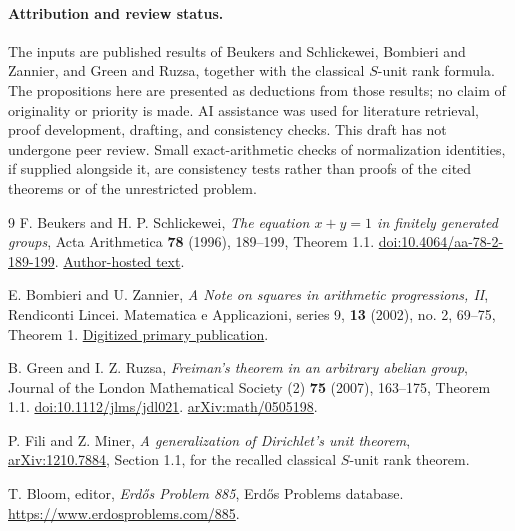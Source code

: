 \documentclass[11pt,letterpaper]{article}
\theoremstyle{remark}\newtheorem{remark}[theorem]{Remark}
\begin{document}
\paragraph{Attribution and review status.}
The inputs are published results of Beukers and Schlickewei, Bombieri and Zannier, and Green and Ruzsa, together with the classical $S$-unit rank formula. The propositions here are presented as deductions from those results; no claim of originality or priority is made. AI assistance was used for literature retrieval, proof development, drafting, and consistency checks. This draft has not undergone peer review. Small exact-arithmetic checks of normalization identities, if supplied alongside it, are consistency tests rather than proofs of the cited theorems or of the unrestricted problem.

\begin{thebibliography}{9}
 F. Beukers and H. P. Schlickewei,
\emph{The equation $x+y=1$ in finitely generated groups},
Acta Arithmetica \textbf{78} (1996), 189--199, Theorem 1.1.
\href{https://doi.org/10.4064/aa-78-2-189-199}{doi:10.4064/aa-78-2-189-199}.
\href{https://webspace.science.uu.nl/~beuke106/s-units.pdf}{Author-hosted text}.

 E. Bombieri and U. Zannier,
\emph{A Note on squares in arithmetic progressions, II},
Rendiconti Lincei. Matematica e Applicazioni, series 9,
\textbf{13} (2002), no. 2, 69--75, Theorem 1.
\href{https://www.bdim.eu/item?fmt=pdf&id=RLIN_2002_9_13_2_69_0}{Digitized primary publication}.

 B. Green and I. Z. Ruzsa,
\emph{Freiman's theorem in an arbitrary abelian group},
Journal of the London Mathematical Society (2) \textbf{75} (2007), 163--175, Theorem 1.1.
\href{https://doi.org/10.1112/jlms/jdl021}{doi:10.1112/jlms/jdl021}.
\href{https://arxiv.org/abs/math/0505198}{arXiv:math/0505198}.

 P. Fili and Z. Miner,
\emph{A generalization of Dirichlet's unit theorem},
\href{https://arxiv.org/abs/1210.7884}{arXiv:1210.7884},
Section 1.1, for the recalled classical $S$-unit rank theorem.

 T. Bloom, editor,
\emph{Erd\H{o}s Problem 885}, Erd\H{o}s Problems database.
\url{https://www.erdosproblems.com/885}.
\end{thebibliography}
\end{document}
